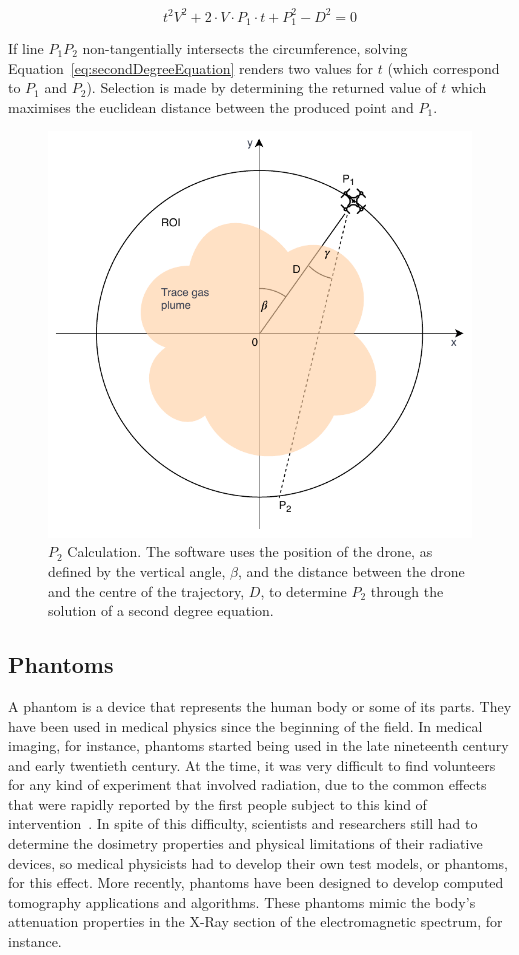 \begin{equation}
    \label{eq:secondDegreeEquation}
    t^2V^2 + 2 \cdot V \cdot P_1 \cdot t + P_{1}^2 - D^2 = 0
\end{equation}

If line $P_1P_2$ non-tangentially intersects the circumference, solving
Equation~\ref{eq:secondDegreeEquation} renders two values for $t$ (which
correspond to $P_1$ and $P_2$). Selection is made by determining the
returned value of $t$ which maximises the euclidean distance between the
produced point and $P_1$.


\begin{figure}[htb]
    \centering
    \includegraphics[width = .8\textwidth]{img/pdf/finding_p2.pdf}
    \caption{$P_2$ Calculation. The software uses the position of the
    drone, as defined by the vertical angle, $\beta$, and the distance between
    the drone and the centre of the trajectory, $D$, to determine $P_2$
    through the solution of a second degree equation.}\label{fig:p2_calculation}
\end{figure}

\subsection{Phantoms}%
\label{sub:phantoms}

A phantom is a device that represents the human body or some of its
parts. They have been used in medical physics since the beginning of the
field. In medical imaging, for instance, phantoms started being used in
the late nineteenth century and early twentieth century. At the time, it
was very difficult to find volunteers for any kind of experiment that
involved radiation, due to the common effects that were rapidly reported
by the first people subject to this kind of
intervention~\cite{Dewerd2014}. In spite of this difficulty, scientists
and researchers still had to determine the dosimetry properties and
physical limitations of their radiative devices, so medical physicists
had to develop their own test models, or phantoms, for this effect. More
recently, phantoms have been designed to develop computed tomography
applications and algorithms. These phantoms mimic the body's attenuation
properties in the X-Ray section of the electromagnetic spectrum, for
instance.


